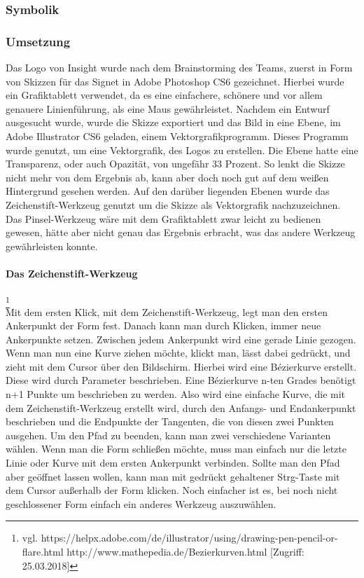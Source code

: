 \subsubsection{Symbolik}
\subsubsection{Umsetzung}
Das Logo von Insight wurde nach dem Brainstorming des Teams, zuerst in Form von Skizzen für das Signet in Adobe Photoshop CS6 gezeichnet. Hierbei wurde ein Grafiktablett verwendet, da es eine einfachere, schönere und vor allem genauere Linienführung, als eine Maus gewährleistet.
Nachdem ein Entwurf ausgesucht wurde, wurde die Skizze exportiert und das Bild in eine Ebene, im Adobe Illustrator CS6 geladen, einem Vektorgrafikprogramm. Dieses Programm wurde genutzt, um eine Vektorgrafik, des Logos zu erstellen. Die Ebene hatte eine Transparenz, oder auch Opazität, von ungefähr 33 Prozent. So lenkt die Skizze nicht mehr von dem Ergebnis ab, kann aber doch noch gut auf dem weißen Hintergrund gesehen werden. Auf den darüber liegenden Ebenen wurde das Zeichenstift-Werkzeug genutzt um die Skizze als Vektorgrafik nachzuzeichnen. Das Pinsel-Werkzeug wäre mit dem Grafiktablett zwar leicht zu bedienen gewesen, hätte aber nicht genau das Ergebnis erbracht, was das andere Werkzeug gewährleisten konnte.
\leavevmode \\

\paragraph{Das Zeichenstift-Werkzeug}
\footnote{\label{} vgl. https://helpx.adobe.com/de/illustrator/using/drawing-pen-pencil-or-flare.html	http://www.mathepedia.de/Bezierkurven.html [Zugriff: 25.03.2018]}
\leavevmode \\
Mit dem ersten Klick, mit dem Zeichenstift-Werkzeug, legt man den ersten Ankerpunkt der Form fest. Danach kann man durch Klicken, immer neue Ankerpunkte setzen. Zwischen jedem Ankerpunkt wird eine gerade Linie gezogen. Wenn man nun eine Kurve ziehen möchte, klickt man, lässt dabei gedrückt, und zieht mit dem Cursor über den Bildschirm. Hierbei wird eine Bézierkurve erstellt. Diese wird durch Parameter beschrieben. Eine Bézierkurve n-ten Grades benötigt n+1 Punkte um beschrieben zu werden. Also wird eine einfache Kurve, die mit dem Zeichenstift-Werkzeug erstellt wird, durch den Anfangs- und Endankerpunkt beschrieben und die Endpunkte der Tangenten, die von diesen zwei Punkten ausgehen. Um den Pfad zu beenden, kann man zwei verschiedene Varianten wählen. Wenn man die Form schließen möchte, muss man einfach nur die letzte Linie oder Kurve mit dem ersten Ankerpunkt verbinden. Sollte man den Pfad aber geöffnet lassen wollen, kann man mit gedrückt gehaltener Strg-Taste mit dem Cursor außerhalb der Form klicken. Noch einfacher ist es, bei noch nicht geschlossener Form einfach ein anderes Werkzeug auszuwählen.
\leavevmode \\

